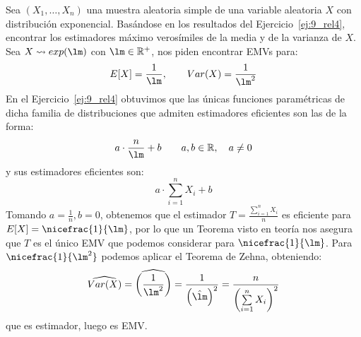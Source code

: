 \begin{ejercicio}
    Sea $(X_1, \ldots, X_n)$ una muestra aleatoria simple de una variable aleatoria $X$ con distribución exponencial. Basándose en los resultados del Ejercicio~\ref{ej:9_rel4}, encontrar los estimadores máximo verosímiles de la media y de la varianza de $X$.\\

    \noindent
    Sea $X\rightsquigarrow exp(\lm)$ con $\lm\in \mathbb{R}^+$, nos piden encontrar EMVs para:
    \begin{equation*}
        E[X] = \frac{1}{\lm}, \qquad Var(X) = \frac{1}{\lm^2}
    \end{equation*}
    En el Ejercicio~\ref{ej:9_rel4} obtuvimos que las únicas funciones paramétricas de dicha familia de distribuciones que admiten estimadores eficientes son las de la forma:
    \begin{equation*}
        a\cdot \frac{n}{\lm} +b \qquad a,b\in \mathbb{R}, \quad a\neq 0
    \end{equation*}
    y sus estimadores eficientes son:
    \begin{equation*}
        a\cdot \sum_{i=1}^{n}X_i + b
    \end{equation*}
    Tomando $a=\frac{1}{n}, b=0$, obtenemos que el estimador $T=\frac{\sum\limits_{i=1}^nX_i}{n}$ es eficiente para $E[X] = \nicefrac{1}{\lm}$, por lo que un Teorema visto en teoría nos asegura que $T$ es el único EMV que podemos considerar para $\nicefrac{1}{\lm}$. Para $\nicefrac{1}{\lm^2}$ podemos aplicar el Teorema de Zehna, obteniendo:
    \begin{equation*}
        \widehat{Var(X)} = \widehat{{\left(\frac{1}{\lm^2}\right)}} = \frac{1}{{\left(\hat{\lm}\right)}^{2}} = \frac{n}{{\left(\sum\limits_{i=1}^{n}X_i\right)}^{2}}
    \end{equation*}
    que es estimador, luego es EMV.
\end{ejercicio}

